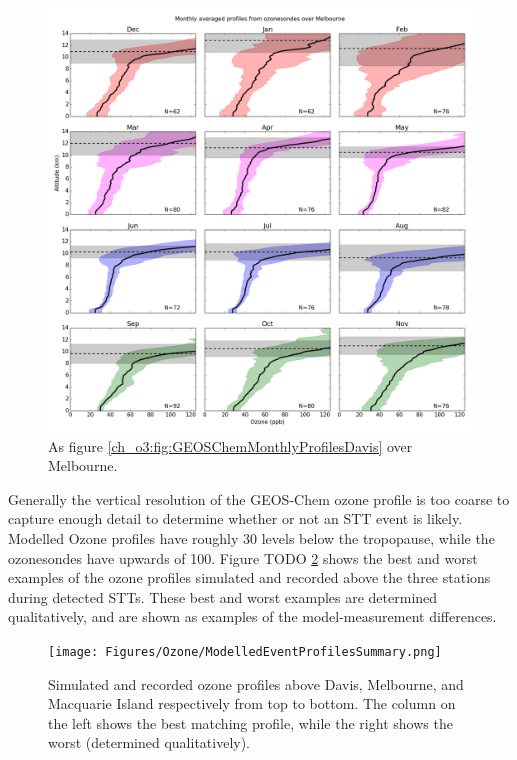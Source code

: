     \begin{figure}[!htbp]
      \includegraphics[width=\textwidth]{Figures/Ozone/Melbourne_sonde_monthprofiles.png}
      \caption{As figure \ref{ch_o3:fig:GEOSChemMonthlyProfilesDavis} over Melbourne.}
      \label{ch_o3:fig:GEOSChemMonthlyProfilesMelbourne}
    \end{figure}
    
    Generally the vertical resolution of the GEOS-Chem ozone profile is too coarse to capture enough detail to determine whether or not an STT event is likely.
    Modelled Ozone profiles have roughly 30 levels below the tropopause, while the ozonesondes have upwards of 100.
    Figure TODO \ref{ch_o3:fig:GEOSChemEventProfilesSummary} shows the best and worst examples of the ozone profiles simulated and recorded above the three stations during detected STTs.
    These best and worst examples are determined qualitatively, and are shown as examples of the model-measurement differences.
    
    \begin{figure}[!htbp]
      \texttt{[image: Figures/Ozone/ModelledEventProfilesSummary.png]}
      \caption{Simulated and recorded ozone profiles above Davis, Melbourne, and Macquarie Island respectively from top to bottom.
      The column on the left shows the best matching profile, while the right shows the worst (determined qualitatively).}
      \label{ch_o3:fig:GEOSChemEventProfilesSummary}
    \end{figure}
    
